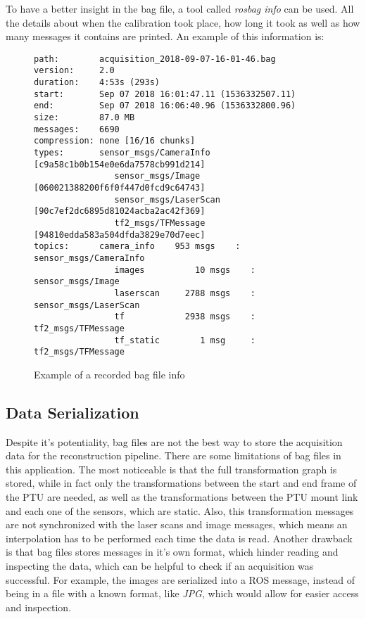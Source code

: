 To have a better insight in the bag file, a tool called \emph{rosbag info} can be used. All the details about when the calibration took place, how long it took as well as how many messages it contains are printed. An example of this information is:

\begin{figure}
    
    \begin{Verbatim}[frame=single]
path:        acquisition_2018-09-07-16-01-46.bag
version:     2.0
duration:    4:53s (293s)
start:       Sep 07 2018 16:01:47.11 (1536332507.11)
end:         Sep 07 2018 16:06:40.96 (1536332800.96)
size:        87.0 MB
messages:    6690
compression: none [16/16 chunks]
types:       sensor_msgs/CameraInfo [c9a58c1b0b154e0e6da7578cb991d214]
                sensor_msgs/Image      [060021388200f6f0f447d0fcd9c64743]
                sensor_msgs/LaserScan  [90c7ef2dc6895d81024acba2ac42f369]
                tf2_msgs/TFMessage     [94810edda583a504dfda3829e70d7eec]
topics:      camera_info    953 msgs    : sensor_msgs/CameraInfo
                images          10 msgs    : sensor_msgs/Image     
                laserscan     2788 msgs    : sensor_msgs/LaserScan 
                tf            2938 msgs    : tf2_msgs/TFMessage    
                tf_static        1 msg     : tf2_msgs/TFMessage
    \end{Verbatim}

    \caption{Example of a recorded bag file info}
    \label{figure:bag-file-example}
\end{figure}

\subsection{Data Serialization}
 
Despite it's potentiality, bag files are not the best way to store the acquisition data for the reconstruction pipeline. There are some limitations of bag files in this application. The most noticeable is that the full transformation graph is stored, while in fact only the transformations between the start and end frame of the PTU are needed, as well as the transformations between the PTU mount link and each one of the sensors, which are static. Also, this transformation messages are not synchronized with the laser scans and image messages, which means an interpolation has to be performed each time the data is read. Another drawback is that bag files stores messages in it's own format, which hinder reading and inspecting the data, which can be helpful to check if an acquisition was successful. For example, the images are serialized into a ROS message, instead of being in a file with a known format, like \emph{JPG}, which would allow for easier access and inspection.

